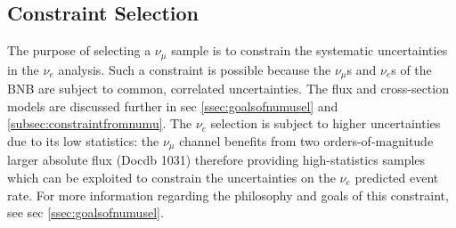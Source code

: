 \subsection{Constraint Selection}
\label{ssec:NuMUCCsel:constr}
\par The purpose of selecting a $\nu_{\mu}$ sample is to constrain the systematic uncertainties in the $\nu_{e}$ analysis. Such a constraint is possible because the $\nu_{\mu}$s and $\nu_{e}$s of the BNB are subject to common, correlated uncertainties. The flux and cross-section models are discussed further in sec \ref{ssec:goalsofnumusel} and \ref{subsec:constraintfromnumu}. The $\nu_{e}$ selection is subject to higher uncertainties due to its low statistics: the $\nu_{\mu}$ channel benefits from two orders-of-magnitude larger absolute flux (Docdb 1031) therefore providing high-statistics samples which can be exploited to constrain the uncertainties on the $\nu_{e}$ predicted event rate. For more information regarding the philosophy and goals of this constraint, see sec \ref{ssec:goalsofnumusel}.

